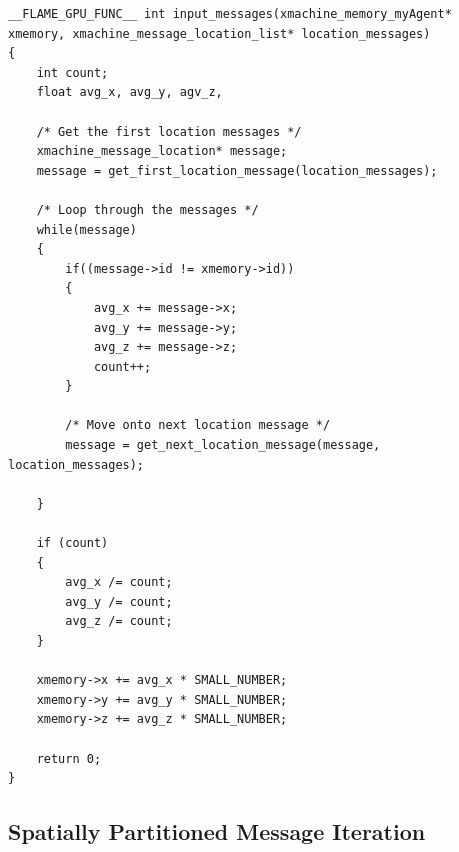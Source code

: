\documentclass[11pt, a4paper, onecolumn, oneside]{report}
\begin{document}
\begin{lstlisting}[language=C_]
__FLAME_GPU_FUNC__ int input_messages(xmachine_memory_myAgent* xmemory, xmachine_message_location_list* location_messages)
{
    int count;
    float avg_x, avg_y, agv_z,

    /* Get the first location messages */
    xmachine_message_location* message;
    message = get_first_location_message(location_messages);

    /* Loop through the messages */
    while(message)
    {
        if((message->id != xmemory->id))
        {
            avg_x += message->x;
            avg_y += message->y;
            avg_z += message->z;
            count++;
        }

        /* Move onto next location message */
        message = get_next_location_message(message, location_messages);

    }

    if (count)
    {
        avg_x /= count;
        avg_y /= count;
        avg_z /= count;
    }

    xmemory->x += avg_x * SMALL_NUMBER;
    xmemory->y += avg_y * SMALL_NUMBER;
    xmemory->z += avg_z * SMALL_NUMBER;

    return 0;
}
\end{lstlisting}

\subsection{Spatially Partitioned Message Iteration}
\label{sec:352}
\end{document}
